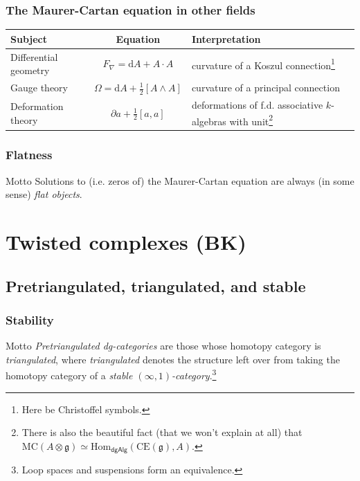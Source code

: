 \documentclass{beamer}
\begin{document}
        \begin{frame}\frametitle{The Maurer-Cartan equation in other fields}
            \begin{table}
                \begin{tabular}{p{1.8cm}cp{3.9cm}}\toprule
                    Subject & Equation & Interpretation\\\midrule
                    Differential geometry & $F_\nabla = \mathrm{d}A + A\cdot A$ & curvature of a Koszul connection\footnote{Here be Christoffel symbols.}\\[.5em]
                    Gauge theory & $\Omega = \mathrm{d}A + \frac12[A\wedge A]$ & curvature of a principal connection\\[.5em]
                    Deformation theory & $\partial a+\frac12[a,a]$ & deformations of f.d. associative $k$-algebras with unit\footnote{There is also the beautiful fact (that we won't explain at all) that $\mathrm{MC}(A\otimes\mathfrak{g}) \simeq \mathrm{Hom}_\mathsf{dgAlg}(\mathrm{CE}(\mathfrak{g}),A)$.}
                    \\\bottomrule
                \end{tabular}
            \end{table}
        \end{frame}

        \begin{frame}\frametitle{Flatness}
            \begin{block}{Motto}
                Solutions to (i.e. zeros of) the Maurer-Cartan equation are always (in some sense) \emph{flat objects}.
            \end{block}
        \end{frame}


\section{Twisted complexes (BK)}
    
    \subsection{Pretriangulated, triangulated, and stable}

        \begin{frame}\frametitle{Stability}
            \begin{block}{Motto}
                \emph{Pretriangulated dg-categories} are those whose homotopy category is \emph{triangulated}, where \emph{triangulated} denotes the structure left over from taking the homotopy category of a \emph{stable $(\infty,1)$-category}.\footnote{Loop spaces and suspensions form an equivalence.}
            \end{block}
        \end{frame}
\end{document}
